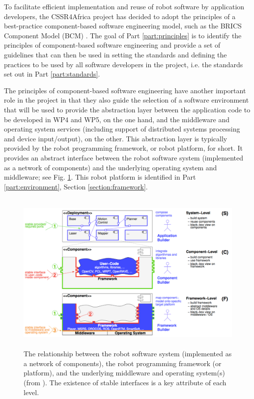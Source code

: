 \documentclass{CSSRforAfrica}
\begin{document}
To facilitate efficient implementation and reuse of robot software by application developers, the CSSR4Africa project has decided to adopt the principles of a best-practice component-based software engineering model, such as the BRICS Component Model (BCM) \cite{Soetensetal10,Shakhimardanovetal10,Bruyninckx10,Bruyninckxetal13}.  The goal of Part \ref{part:principles} is to identify the principles of component-based software engineering and provide a set of guidelines that can then be used in setting the standards and defining the practices to be used by all software developers in the project, i.e. the standards set out in Part  \ref{part:standards}.
 


The  principles of component-based software engineering have another important role in the project in that they also guide the selection of a software  environment that will be used to provide the abstraction layer between the application code to be developed in WP4 and WP5, on the one hand, and the middleware and operating system services (including support of distributed systems processing and device input/output), on the other.  This abstraction layer is typically provided by the robot programming framework, or robot platform, for short.  It provides an abstract interface between the robot software system (implemented as a network of components) and the underlying operating system and middleware; see Fig. \ref{fig:levels}.   This robot platform is identified in Part  \ref{part:environment}, Section \ref{section:framework}.


\begin{figure}[thb]
\begin{center}
\includegraphics[height=80mm,angle=0]{./figs/levels.pdf}
\end{center}
\caption{The relationship between the robot software system (implemented as a network of components), the robot programming framework (or platform), and the underlying middleware and operating system(s) (from \cite{SchlegelSteckLotz2011}). The existence of stable interfaces is a key attribute of each level.}
\label{fig:levels}       
\end{figure}
\end{document}
